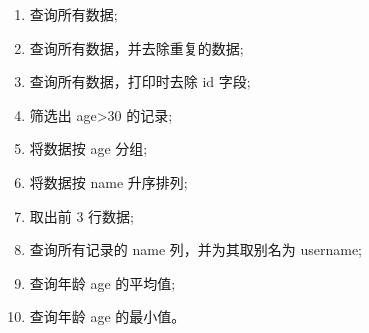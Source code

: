 \documentclass{article}
\begin{document}
\begin{enumerate}
  \item 查询所有数据;
  \item 查询所有数据，并去除重复的数据;
  \item 查询所有数据，打印时去除 id 字段;
  \item 筛选出 age>30 的记录;
  \item 将数据按 age 分组;
  \item 将数据按 name 升序排列;
  \item 取出前 3 行数据;
  \item 查询所有记录的 name 列，并为其取别名为 username;
  \item 查询年龄 age 的平均值;
  \item 查询年龄 age 的最小值。
\end{enumerate}
\end{document}
